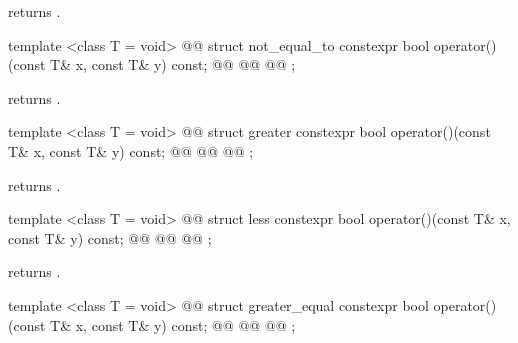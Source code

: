 \begin{itemdescr}
\pnum
{} returns .
\end{itemdescr}

%
\begin{itemdecl}
template <class T = void>
  @@
struct not_equal_to {
  constexpr bool operator()(const T& x, const T& y) const;
  @@
  @@
  @@
};
\end{itemdecl}

\begin{itemdescr}
\pnum
{} returns .
\end{itemdescr}

%
\begin{itemdecl}
template <class T = void>
  @@
struct greater {
  constexpr bool operator()(const T& x, const T& y) const;
  @@
  @@
  @@
};
\end{itemdecl}

\begin{itemdescr}
\pnum
{} returns .
\end{itemdescr}

%
\begin{itemdecl}
template <class T = void>
  @@
struct less {
  constexpr bool operator()(const T& x, const T& y) const;
  @@
  @@
  @@
};
\end{itemdecl}

\begin{itemdescr}
\pnum
{} returns .
\end{itemdescr}

%
\begin{itemdecl}
template <class T = void>
  @@
struct greater_equal {
  constexpr bool operator()(const T& x, const T& y) const;
  @@
  @@
  @@
};
\end{itemdecl}

